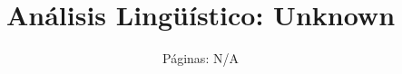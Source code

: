 \documentclass{article}%
\title{Análisis Lingüístico: Unknown}%
\author{Páginas: N/A}%
\begin{document}
%
\normalsize%
\maketitle%
\end{document}
